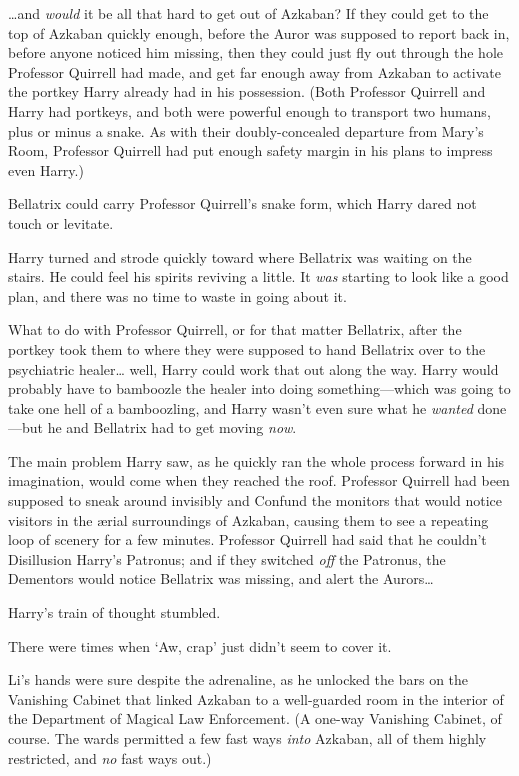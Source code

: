 {\ldots}and \emph{would} it be all that hard to get out of Azkaban? If they could get to the top of Azkaban quickly enough, before the Auror was supposed to report back in, before anyone noticed him missing, then they could just fly out through the hole Professor Quirrell had made, and get far enough away from Azkaban to activate the portkey Harry already had in his possession. (Both Professor Quirrell and Harry had portkeys, and both were powerful enough to transport two humans, plus or minus a snake. As with their doubly-concealed departure from Mary's Room, Professor Quirrell had put enough safety margin in his plans to impress even Harry.)

Bellatrix could carry Professor Quirrell's snake form, which Harry dared not touch or levitate.

Harry turned and strode quickly toward where Bellatrix was waiting on the stairs. He could feel his spirits reviving a little. It \emph{was} starting to look like a good plan, and there was no time to waste in going about it.

What to do with Professor Quirrell, or for that matter Bellatrix, after the portkey took them to where they were supposed to hand Bellatrix over to the psychiatric healer{\ldots} well, Harry could work that out along the way. Harry would probably have to bamboozle the healer into doing something—which was going to take one hell of a bamboozling, and Harry wasn't even sure what he \emph{wanted} done—but he and Bellatrix had to get moving \emph{now}.

The main problem Harry saw, as he quickly ran the whole process forward in his imagination, would come when they reached the roof. Professor Quirrell had been supposed to sneak around invisibly and Confund the monitors that would notice visitors in the ærial surroundings of Azkaban, causing them to see a repeating loop of scenery for a few minutes. Professor Quirrell had said that he couldn't Disillusion Harry's Patronus; and if they switched \emph{off} the Patronus, the Dementors would notice Bellatrix was missing, and alert the Aurors{\ldots}

Harry's train of thought stumbled.

There were times when `Aw, crap' just didn't seem to cover it.

\later

Li's hands were sure despite the adrenaline, as he unlocked the bars on the Vanishing Cabinet that linked Azkaban to a well-guarded room in the interior of the Department of Magical Law Enforcement. (A one-way Vanishing Cabinet, of course. The wards permitted a few fast ways \emph{into} Azkaban, all of them highly restricted, and \emph{no} fast ways out.)

